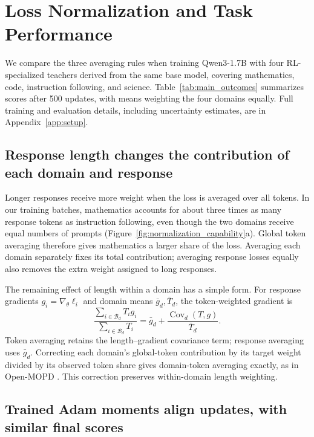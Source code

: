 \section{Loss Normalization and Task Performance}
\label{sec:normalization}

We compare the three averaging rules when training Qwen3-1.7B with four RL-specialized teachers derived from the same base model, covering mathematics, code, instruction following, and science. Table~\ref{tab:main_outcomes} summarizes scores after 500 updates, with means weighting the four domains equally. Full training and evaluation details, including uncertainty estimates, are in Appendix~\ref{app:setup}.



\subsection{Response length changes the contribution of each domain and response}

Longer responses receive more weight when the loss is averaged over all tokens. In our training batches, mathematics accounts for about three times as many response tokens as instruction following, even though the two domains receive equal numbers of prompts (Figure~\ref{fig:normalization_capability}a). Global token averaging therefore gives mathematics a larger share of the loss. Averaging each domain separately fixes its total contribution; averaging response losses equally also removes the extra weight assigned to long responses.

The remaining effect of length within a domain has a simple form. For response gradients $g_i=\nabla_\theta\ell_i$ and domain means $\bar g_d,\bar T_d$, the token-weighted gradient is
\begin{equation}
\frac{\sum_{i\in\mathcal B_d}T_i g_i}{\sum_{i\in\mathcal B_d}T_i}
=\bar g_d+\frac{\operatorname{Cov}_d(T,g)}{\bar T_d}.
\label{eq:weighting}
\end{equation}
Token averaging retains the length--gradient covariance term; response averaging uses $\bar g_d$. Correcting each domain's global-token contribution by its target weight divided by its observed token share gives domain-token averaging exactly, as in Open-MOPD \citep{gao2026openmopddiagnosingfixingcapability}. This correction preserves within-domain length weighting.

\subsection{Trained Adam moments align updates, with similar final scores}

